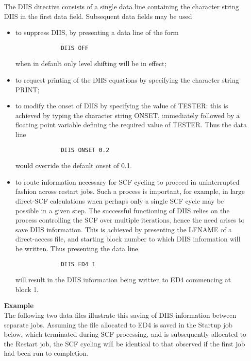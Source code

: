\documentclass[11pt,fleqn]{article}
\begin{document}
The DIIS directive consists of a single  data line 
containing the character string DIIS in the first data
field. Subsequent data fields may be used
\begin{itemize}
\item to suppress DIIS, by presenting a data line of the
form
{
\footnotesize
\begin{verbatim}
             DIIS OFF
\end{verbatim}
}
when in default only level shifting will be in effect;
\item to request printing of the DIIS equations by
specifying the character string PRINT;
\item to modify the onset of DIIS by specifying the 
value of TESTER: this is achieved by typing the character
string ONSET, immediately followed by a floating point variable
defining the required value of TESTER. Thus the data line

{
\footnotesize
\begin{verbatim}
             DIIS ONSET 0.2
\end{verbatim}
}
would override the default onset of 0.1.
\item  to route information necessary for SCF cycling to proceed in
uninterrupted fashion across restart jobs. Such a process is important,
for example, in large direct-SCF calculations when perhaps only a single
SCF cycle may be possible in a given step.  The successful functioning of
DIIS relies on the process controlling the SCF over multiple iterations,
hence the need arises to save DIIS information. This is achieved by
presenting the LFNAME of a direct-access file, and starting block number
to which DIIS information will be written. Thus presenting the data line

{
\footnotesize
\begin{verbatim}
             DIIS ED4 1
\end{verbatim}
}
will result in the DIIS information being written
to ED4 commencing at block 1.
\end{itemize}
{\bf Example}\\

The following two data files illustrate this saving of DIIS information
between separate jobs. Assuming the file allocated to ED4 is saved in
the Startup job below, which terminated during SCF processing,  and
is subsequently allocated to the Restart job, the SCF cycling will be
identical to that observed if the first job had been run to completion.\\
\end{document}
